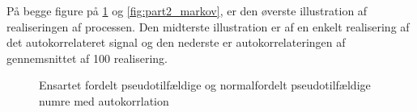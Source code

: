 På begge figure på \ref{fig:part2_ran} og \ref{fig:part2_markov}, er den øverste illustration af realiseringen af processen. Den midterste illustration er af en enkelt realisering af det autokorrelateret signal og den nederste er autokorrelateringen  af gennemsnittet af 100 realisering.  
 \begin{figure}[!h]
	\centering
	\caption{ Ensartet fordelt pseudotilfældige og normalfordelt pseudotilfældige numre med autokorrlation }
	\label{fig:part2_ran}
\end{figure}

